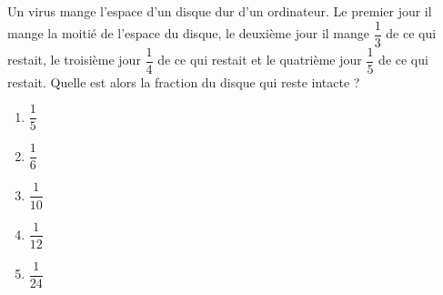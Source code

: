 Un virus mange l'espace d'un disque dur d'un ordinateur. Le premier jour il mange la moitié de l'espace du disque, le deuxième jour il mange $\dfrac13$ de ce qui restait, le troisième jour $\dfrac14$ de ce qui restait et le quatrième jour $\dfrac15$ de ce qui restait. Quelle est alors la fraction du disque qui reste intacte ?
\begin{multicols}{5}
  \begin{enumerate}[A/]
  \item $\dfrac15$
  \item $\dfrac16$
  \item $\dfrac1{10}$
  \item $\dfrac1{12}$
  \item $\dfrac1{24}$
  \end{enumerate}
\end{multicols}